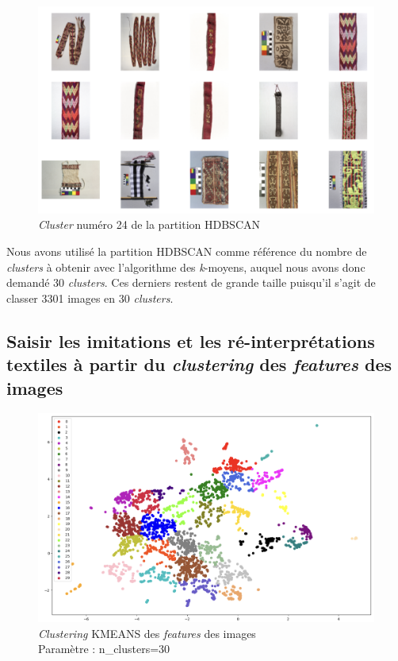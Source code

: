 \begin{figure}[!h]
	\begin{center}
		\includegraphics[width=12cm]{../images/YOLO_NS_HDBSCAN_24.png}
		\caption{\textit{Cluster} numéro 24 de la partition HDBSCAN}
	 \end{center}
\end{figure}

Nous avons utilisé la partition HDBSCAN comme référence du nombre de \textit{clusters} à obtenir avec l'algorithme des \textit{k}-moyens, auquel nous avons donc demandé 30 \textit{clusters}. Ces derniers restent de grande taille puisqu'il s'agit de classer 3301 images en 30 \textit{clusters}.

\subsection{Saisir les imitations et les ré-interprétations textiles à partir du \textit{clustering} des \textit{features} des images}

\begin{figure}[!h]
	\begin{center}
		\includegraphics[width=16cm]{../images/YOLO_NS_KMEAN.png}
		\caption{\textit{Clustering} KMEANS des \textit{features} des images \\ Paramètre : n\_clusters=30}
	 \end{center}
\end{figure}

